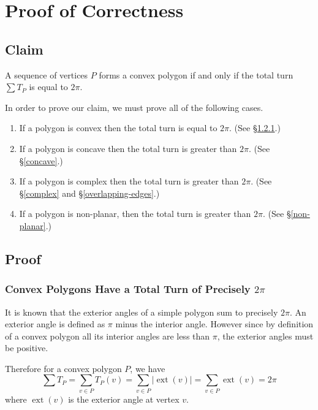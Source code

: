 \documentclass{article}
\newcommand{\exta}{\operatorname{ext}} %
\begin{document}
\section{Proof of Correctness}

\subsection{Claim}

A sequence of vertices \(P\) forms a convex polygon if and only if the total turn \(\sum T_P\) is equal to \(2\pi\).

In order to prove our claim, we must prove all of the following cases.
\begin{enumerate}
	\item If a polygon is convex then the total turn is equal to \(2\pi\). (See \S\ref{convex}.)
	\item If a polygon is concave then the total turn is greater than \(2\pi\). (See \S\ref{concave}.)
	\item If a polygon is complex then the total turn is greater than \(2\pi\). (See \S\ref{complex} and \S\ref{overlapping-edges}.)
	\item If a polygon is non-planar, then the total turn is greater than \(2\pi\). (See \S\ref{non-planar}.)
\end{enumerate}

\subsection{Proof}

\subsubsection{Convex Polygons Have a Total Turn of Precisely \(2\pi\)} \label{convex}

It is known that the exterior angles of a simple polygon sum to precisely \(2\pi\). An exterior angle is defined as \(\pi\) minus the interior angle. However since by definition of a convex polygon all its interior angles are less than \(\pi\), the exterior angles must be positive.

Therefore for a convex polygon \(P\), we have
\begin{equation*}
	\sum T_P = \sum_{v \in P} T_P(v) = \sum_{v \in P} | \exta(v) | = \sum_{v \in P} \exta (v) = 2\pi
\end{equation*}
where \(\exta (v)\) is the exterior angle at vertex \(v\).
\end{document}
